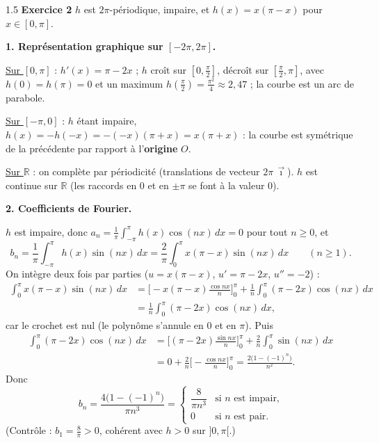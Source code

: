 \documentclass[12pt]{article}
\begin{document}
\begin{spacing}{1.5}
\medskip\textbf{Exercice 2} \quad $h$ est $2\pi$-périodique, impaire, et $h(x)=x(\pi-x)$ pour $x\in[0,\pi]$.

\textbf{1. Représentation graphique sur $[-2\pi,2\pi]$.}

\underline{Sur $[0,\pi]$} : $h'(x)=\pi-2x$ ; $h$ croît sur $[0,\frac\pi2]$, décroît sur $[\frac\pi2,\pi]$, avec $h(0)=h(\pi)=0$ et un maximum $h(\frac\pi2)=\frac{\pi^2}{4}\approx2{,}47$ ; la courbe est un arc de parabole.

\underline{Sur $[-\pi,0]$} : $h$ étant impaire, $h(x)=-h(-x)=-(-x)(\pi+x)=x(\pi+x)$ : la courbe est symétrique de la précédente par rapport à l'\textbf{origine} $O$.

\underline{Sur $\mathbb{R}$} : on complète par périodicité (translations de vecteur $2\pi\,\vec\imath$). $h$ est continue sur $\mathbb{R}$ (les raccords en $0$ et en $\pm\pi$ se font à la valeur $0$).

\begin{center}
\end{center}

\textbf{2. Coefficients de Fourier.}

$h$ est impaire, donc $a_n=\frac1\pi\int_{-\pi}^{\pi}h(x)\cos(nx)\,dx=0$ pour tout $n\ge0$, et
\[
b_n=\frac1\pi\int_{-\pi}^{\pi}h(x)\sin(nx)\,dx=\frac2\pi\int_0^\pi x(\pi-x)\sin(nx)\,dx\qquad(n\ge1).
\]
On intègre deux fois par parties ($u=x(\pi-x)$, $u'=\pi-2x$, $u''=-2$) :
\[
\begin{split}
\int_0^\pi x(\pi-x)\sin(nx)\,dx&=\Big[-x(\pi-x)\frac{\cos nx}{n}\Big]_0^\pi+\frac1n\int_0^\pi(\pi-2x)\cos(nx)\,dx\\
&=\frac1n\int_0^\pi(\pi-2x)\cos(nx)\,dx,
\end{split}
\]
car le crochet est nul (le polynôme s'annule en $0$ et en $\pi$). Puis
\[
\begin{split}
\int_0^\pi(\pi-2x)\cos(nx)\,dx&=\Big[(\pi-2x)\frac{\sin nx}{n}\Big]_0^\pi+\frac2n\int_0^\pi\sin(nx)\,dx\\
&=0+\frac2n\Big[-\frac{\cos nx}{n}\Big]_0^\pi=\frac{2\big(1-(-1)^n\big)}{n^2}.
\end{split}
\]
Donc
\[
\boxed{b_n=\frac{4\big(1-(-1)^n\big)}{\pi n^3}}=\begin{cases}\dfrac{8}{\pi n^3}&\text{si } n \text{ est impair,}\\[2mm]0&\text{si } n \text{ est pair.}\end{cases}
\]
(Contrôle : $b_1=\frac8\pi>0$, cohérent avec $h>0$ sur $]0,\pi[$.)


\end{spacing}
\end{document}
